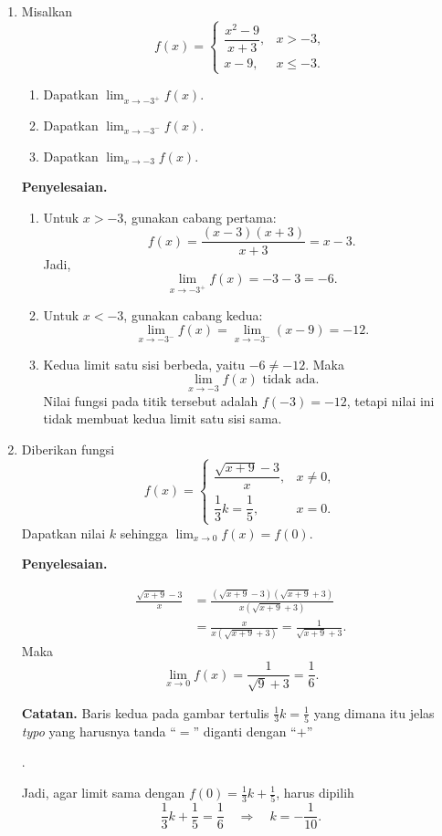 \documentclass[11pt,a4paper]{article}
\newcommand{\jawab}{\par\medskip\textbf{Penyelesaian.}\par}
\newcommand{\catatan}[1]{\par\smallskip\textbf{Catatan.} #1\par}
\begin{document}
\begin{enumerate}
\item[11.] Misalkan
\[
    f(x)=
    \begin{cases}
        \dfrac{x^2-9}{x+3}, & x>-3,\\[6pt]
        x-9, & x\leq-3.
    \end{cases}
\]
\begin{enumerate}
    \item Dapatkan $\displaystyle\lim_{x\to-3^+}f(x)$.
    \item Dapatkan $\displaystyle\lim_{x\to-3^-}f(x)$.
    \item Dapatkan $\displaystyle\lim_{x\to-3}f(x)$.
\end{enumerate}

\jawab
\begin{enumerate}
    \item Untuk $x>-3$, gunakan cabang pertama:
    \[
        f(x)=\frac{(x-3)(x+3)}{x+3}=x-3.
    \]
    Jadi,
    \[
        \boxed{\lim_{x\to-3^+}f(x)=-3-3=-6.}
    \]

    \item Untuk $x<-3$, gunakan cabang kedua:
    \[
        \boxed{\lim_{x\to-3^-}f(x)=\lim_{x\to-3^-}(x-9)=-12.}
    \]

    \item Kedua limit satu sisi berbeda, yaitu $-6\neq-12$. Maka
    \[
        \boxed{\lim_{x\to-3}f(x)\text{ tidak ada}.}
    \]
    Nilai fungsi pada titik tersebut adalah $f(-3)=-12$, tetapi nilai ini
    tidak membuat kedua limit satu sisi sama.
\end{enumerate}

\item[13.] Diberikan fungsi
\[
    f(x)=
    \begin{cases}
        \dfrac{\sqrt{x+9}-3}{x}, & x\neq0,\\[6pt]
        \dfrac13 k=\dfrac15, & x=0.
    \end{cases}
\]
Dapatkan nilai $k$ sehingga $\displaystyle\lim_{x\to0}f(x)=f(0)$.

\jawab
\begin{align*}
    \frac{\sqrt{x+9}-3}{x}
    &=\frac{(\sqrt{x+9}-3)(\sqrt{x+9}+3)}{x(\sqrt{x+9}+3)}\\
    &=\frac{x}{x(\sqrt{x+9}+3)}
     =\frac{1}{\sqrt{x+9}+3}.
\end{align*}
Maka
\[
    \boxed{\lim_{x\to0}f(x)=\frac{1}{\sqrt9+3}=\frac16.}
\]

\catatan{Baris kedua pada gambar tertulis $\frac13 k=\frac15$ yang dimana itu jelas \textit{typo} yang harusnya tanda ``$=$'' diganti dengan ``$+$''}.

Jadi, agar limit sama dengan $f(0)=\frac13 k+\frac15$, harus dipilih
\[
    \frac13 k+\frac15=\frac16\quad\Longrightarrow\quad \boxed{k=-\frac{1}{10}.}
\]
\end{enumerate}
\end{document}
